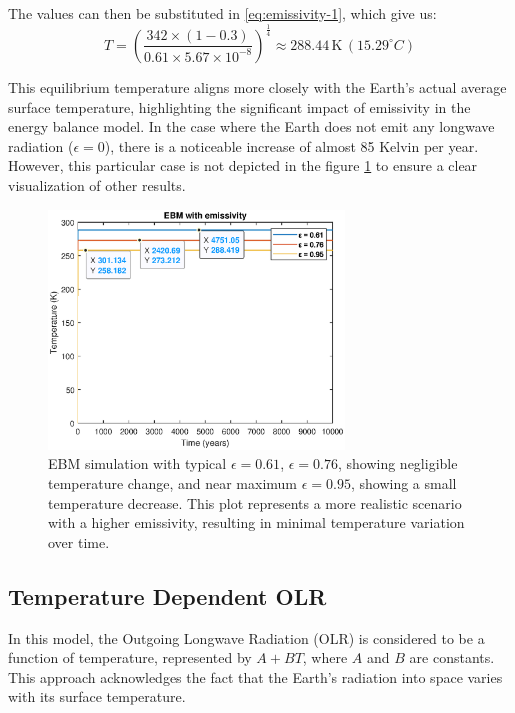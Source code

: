 \documentclass[12pt]{article}
\begin{document}
\noindent The values can then be substituted in \ref{eq:emissivity-1}, which give us:
\begin{equation}
    T = \left( \frac{342 \times (1 - 0.3)}{0.61 \times 5.67 \times 10^{-8}} \right)^{\frac{1}{4}} \approx 288.44 \, \text{K} \, ({15.29}^\circ C)
\end{equation}

This equilibrium temperature aligns more closely with the Earth's actual average surface temperature, highlighting the significant impact of emissivity in the energy balance model. In the case where the Earth does not emit any longwave radiation ($\epsilon=0$), there is a noticeable increase of almost 85 Kelvin per year. However, this particular case is not depicted in the figure \ref{fig:ebm_emissivity} to ensure a clear visualization of other results.

\begin{figure}[H]
    \centering
    \includegraphics[width=0.7\textwidth]{images/ebm_emissivity_diff.eps}
    \caption{EBM simulation with typical $\epsilon=0.61$, $\epsilon=0.76$, showing negligible temperature change, and near maximum $\epsilon=0.95$, showing a small temperature decrease. This plot represents a more realistic scenario with a higher emissivity, resulting in minimal temperature variation over time.}
    \label{fig:ebm_emissivity}
\end{figure}

\subsection{Temperature Dependent OLR} \label{section:olr-temperature}
In this model, the Outgoing Longwave Radiation (OLR) is considered to be a function of temperature, represented by \( A + BT \), where \( A \) and \( B \) are constants. This approach acknowledges the fact that the Earth's radiation into space varies with its surface temperature\cite{kaper-2013-math-ac-budyko}.
\end{document}
